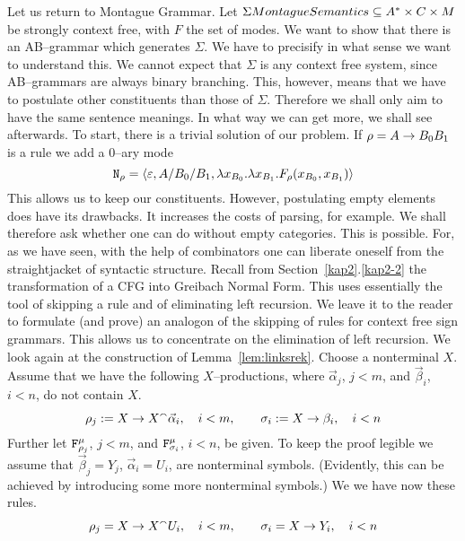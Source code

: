 Let us return to Montague Grammar. Let $\Sigma
\index{Montague Semantics}%
\subseteq A^{\ast} \times C \times M$
be strongly context free, with $F$ the set of modes. We want to
show that there is an AB--grammar which generates
$\Sigma$. We have to precisify in what sense we want to understand
this. We cannot expect that $\Sigma$ is any context free system,
since AB--grammars are always binary branching. This, however,
means that we have to postulate other constituents than those of
$\Sigma$. Therefore we shall only aim to have the same sentence
meanings. In what way we can get more, we shall see afterwards.
To start, there is a trivial solution of our problem.
If $\rho = A \rightarrow B_0 B_1$ is a rule we add a 0--ary mode
\begin{equation}
\mbox{\tt N}_{\rho} = \langle \varepsilon, A/B_0/B_1,
\lambda x_{B_0}.\lambda x_{B_1}.F_{\rho}(x_{B_0}, x_{B_1})\rangle
\end{equation}
This allows us to keep our constituents. However, postulating
empty elements does have its drawbacks. It increases the costs 
of parsing, for example. We shall therefore ask whether one
can do without empty categories. This is possible. For, as we
have seen, with the help of combinators one can liberate oneself
from the straightjacket of syntactic structure. Recall from 
Section~\ref{kap2}.\ref{kap2-2} the transformation of a CFG into Greibach 
Normal Form. This uses essentially the tool of skipping a rule 
and of eliminating left recursion. We leave it to the reader to 
formulate (and prove) an analogon of the skipping of rules for 
context free sign grammars.  This allows us to concentrate on the 
elimination of left recursion. We look again at the construction of
Lemma~\ref{lem:linksrek}. Choose a nonterminal $X$.  Assume
that we have the following $X$--productions, where
$\vec{\alpha}_j$, $j < m$, and $\vec{\beta}_i$, $i < n$,
do not contain $X$.
\begin{equation}
\rho_j := X \rightarrow X{^{\smallfrown}} \vec{\alpha}_i, \quad i < m,
\qquad \sigma_i := X \rightarrow \beta_i, \quad i < n
\end{equation}
Further let $\mbox{\tt F}^{\mu}_{\rho_j}$, $j < m$, and
$\mbox{\tt F}^{\mu}_{\sigma_i}$, $i < n$, be given. To keep
the proof legible we assume that $\vec{\beta}_j = Y_j$,
$\vec{\alpha}_i = U_i$, are nonterminal symbols. (Evidently,
this can be achieved by introducing some more nonterminal
symbols.) We we have now these rules.
\begin{equation}
\rho_j = X \rightarrow X{^{\smallfrown}} U_i, \quad i < m,
\qquad \sigma_i = X \rightarrow Y_i, \quad i < n
\end{equation}
